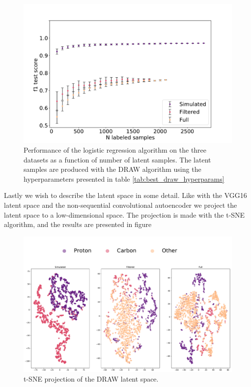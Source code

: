 \begin{figure}
\includegraphics[width=\textwidth]{plots/ac_draw_n_samples.pdf}
\caption[Semi supervised classification with DRAW]{Performance of the logistic regression algorithm on the three datasets as a function of number of latent samples. The latent samples are produced with the DRAW algorithm using the hyperparameters presented in table \ref{tab:best_draw_hyperparams}}\label{fig:draw_nsamples}
\end{figure}


Lastly we wish to describe the latent space in some detail. Like with the VGG16 latent space and the non-sequential convolutional autoencoder we project the latent space to a low-dimensional space. The projection is made with the t-SNE algorithm, and the results are presented in figure 


\begin{figure}
\includegraphics[width=\textwidth]{plots/ac_tsne_draw.pdf}
\caption[t-SNE projection of the DRAW latent space]{t-SNE projection of the DRAW latent space. }
\end{figure}
